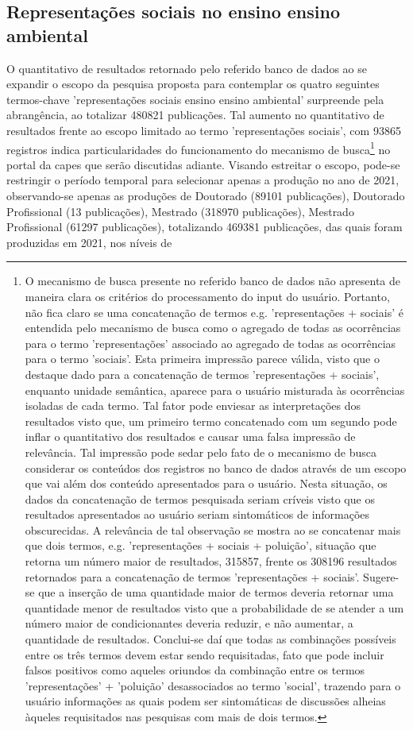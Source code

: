 \documentclass[
   article,       %
   11pt,          %
   oneside,       %
   a4paper,       %
   english,       %
   brazil,           %
   sumario=tradicional
   ]{abntex2}
\begin{document}
\subsection{Representações sociais no ensino ensino ambiental}

O quantitativo de resultados retornado pelo referido banco de dados ao se expandir o escopo da pesquisa proposta para contemplar os quatro seguintes termos-chave 'representações sociais ensino ensino ambiental' surpreende pela abrangência, ao totalizar 480821 publicações. Tal aumento no quantitativo de resultados frente ao escopo limitado ao termo 'representações sociais', com 93865 registros indica particularidades do funcionamento do mecanismo de busca\footnote{O mecanismo de busca presente no referido banco de dados não apresenta de maneira clara os critérios do processamento do input do usuário. Portanto, não fica claro se uma concatenação de termos e.g. 'representações + sociais' é entendida pelo mecanismo de busca como o agregado de todas as ocorrências para o termo 'representações' associado ao agregado de todas as ocorrências para o termo 'sociais'. Esta primeira impressão parece válida, visto que o destaque dado para a concatenação de termos 'representações + sociais', enquanto unidade semântica, aparece para o usuário misturada às ocorrências isoladas de cada termo. Tal fator pode enviesar as interpretações dos resultados visto que, um primeiro termo concatenado com um segundo pode inflar o quantitativo dos resultados e causar uma falsa impressão de relevância. Tal impressão pode sedar pelo fato de o mecanismo de busca considerar os conteúdos dos registros no banco de dados através de um escopo que vai além dos conteúdo apresentados para o usuário. Nesta situação, os dados da concatenação de termos pesquisada seriam críveis visto que os resultados apresentados ao usuário seriam sintomáticos de informações obscurecidas. A relevância de tal observação se mostra ao se concatenar mais que dois termos, e.g. 'representações + sociais + poluição', situação que retorna um número maior de resultados, 315857, frente os 308196 resultados retornados para a concatenação de termos 'representações + sociais'. Sugere-se que a inserção de uma quantidade maior de termos deveria retornar uma quantidade menor de resultados visto que a probabilidade de se atender a um número maior de condicionantes deveria reduzir, e não aumentar, a quantidade de resultados. Conclui-se daí que todas as combinações possíveis entre os três termos devem estar sendo requisitadas, fato que pode incluir falsos positivos como aqueles oriundos da combinação entre os termos 'representações' + 'poluição' desassociados ao termo 'social', trazendo para o usuário informações as quais podem ser sintomáticas de discussões alheias àqueles requisitados nas pesquisas com mais de dois termos.} no portal da capes que serão discutidas adiante. Visando estreitar o escopo, pode-se restringir o período temporal para selecionar apenas a produção no ano de 2021, observando-se apenas as produções de Doutorado (89101 publicações), Doutorado Profissional (13 publicações), Mestrado (318970 publicações), Mestrado Profissional (61297 publicações), totalizando 469381 publicações, das quais foram produzidas em 2021, nos níveis de 
\end{document}
